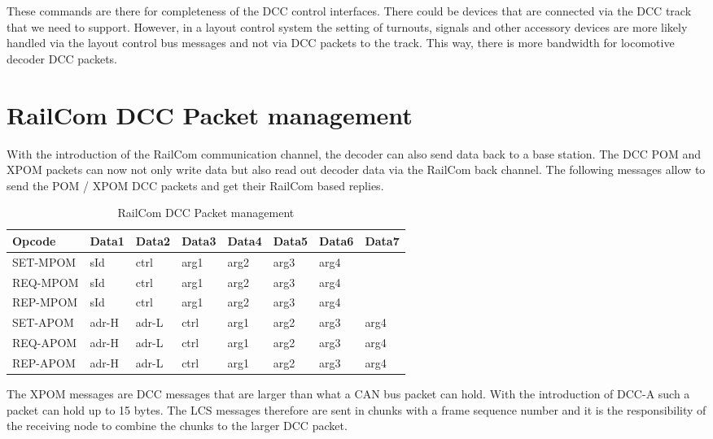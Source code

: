 These commands are there for completeness of the DCC control interfaces. There could be devices that are connected via the DCC track that we need to support. However, in a layout control system the setting of turnouts, signals and other accessory devices are more likely handled via the layout control bus messages and not via DCC packets to the track. This way, there is more bandwidth for locomotive decoder DCC packets.

\section{RailCom DCC Packet management}

With the introduction of the RailCom communication channel, the decoder can also send data back to a base station. The DCC POM and XPOM packets can now not only write data but also read out decoder data via the RailCom back channel. The following messages allow to send the POM / XPOM DCC packets and get their RailCom based replies.

\begin{table}[ht!]
    \begin{center}
        \caption{RailCom DCC Packet management}
        \begin{tabular}{|l|l|l|l|l|l|l|l|}
            \toprule
            \textbf{Opcode}  & \textbf{Data1} & \textbf{Data2} & \textbf{Data3} & \textbf{Data4} & \textbf{Data5} & \textbf{Data6} & \textbf{Data7} \\
            \midrule
            SET-MPOM & sId & ctrl & arg1 & arg2 & arg3 & arg4 & \\
            REQ-MPOM & sId & ctrl & arg1 & arg2 & arg3 & arg4 & \\
            REP-MPOM & sId & ctrl & arg1 & arg2 & arg3 & arg4 & \\
            SET-APOM & adr-H & adr-L & ctrl & arg1 & arg2 & arg3 & arg4 \\
            REQ-APOM & adr-H & adr-L & ctrl & arg1 & arg2 & arg3 & arg4 \\
            REP-APOM & adr-H & adr-L & ctrl & arg1 & arg2 & arg3 & arg4 \\
            \bottomrule
        \end{tabular}
    \end{center}
\end{table}

The XPOM messages are DCC messages that are larger than what a CAN bus packet can hold. With the introduction of DCC-A such a packet can hold up to 15 bytes. The LCS messages therefore are sent in chunks with a frame sequence number and it is the responsibility of the receiving node to combine the chunks to the larger DCC packet.

